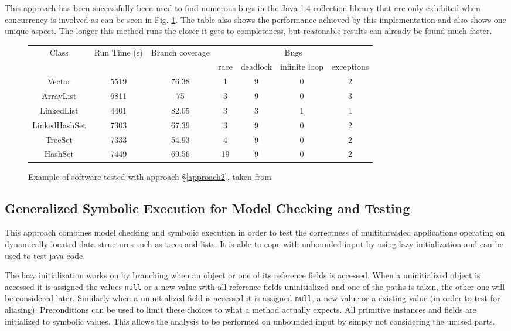 \documentclass[10pt]{llncs}
\begin{document}
This approach has been successfully been used to find numerous bugs in the Java 1.4 collection library that are only exhibited when concurrency is involved as can be seen in Fig. \ref{example:4}. The table also shows the performance achieved by this implementation and also shows one unique aspect. The longer this method runs the closer it gets to completeness, but reasonable results can already be found much faster.

\begin{figure}
	\centering
	
	\begin{tabular}{c | c | c | c | c | c | c}
		Class & Run Time (s) & Branch coverage & \multicolumn{4}{c}{Bugs} \\
		\cline{4-7}
		& & & race & deadlock & infinite loop & exceptions \\
		 
		\hline
		
		Vector & 5519 & 76.38 & 1&9&0&2 \\
		ArrayList & 6811 & 75 & 3&9&0&3 \\
		LinkedList & 4401 & 82.05 & 3&3&1&1 \\
		LinkedHashSet & 7303 & 67.39 & 3&9&0&2 \\
		TreeSet & 7333 & 54.93 & 4&9&0&2 \\
		HashSet & 7449 & 69.56 & 19&9&0&2 \\
	\end{tabular}
	
	\caption{Example of software tested with approach §\ref{approach2}, taken from \cite{base4}}
	\label{example:4}
\end{figure}

\subsection{Generalized Symbolic Execution for Model Checking and Testing \cite{base5}}

This approach combines model checking and symbolic execution in order to test the correctness of multithreaded applications operating on dynamically located data structures such as trees and lists. It is able to cope with unbounded input by using lazy initialization and can be used to test java code.

The lazy initialization works on by branching when an object or one of its reference fields is accessed. When a uninitialized object is accessed it is assigned the values \texttt{null} or a new value with all reference fields uninitialized and one of the paths is taken, the other one will be considered later. Similarly when a uninitialized field is accessed it is assigned \texttt{null}, a new value or a existing value (in order to test for aliasing). Preconditions can be used to limit these choices to what a method actually expects. All primitive instances and fields are initialized to symbolic values. This allows the analysis to be performed on unbounded input by simply not considering the unused parts.
\end{document}
